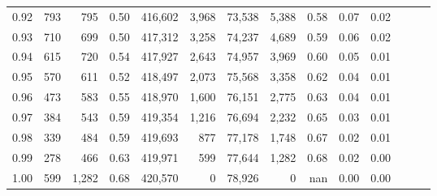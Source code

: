 \begin{tabular}{rrrrrrrrrrrrrr}
0.92 &    793 &    795 &  0.50 &  416,602 &    3,968 &  73,538 &   5,388 &  0.58 &  0.07 &      0.02 \\
0.93 &    710 &    699 &  0.50 &  417,312 &    3,258 &  74,237 &   4,689 &  0.59 &  0.06 &      0.02 \\
0.94 &    615 &    720 &  0.54 &  417,927 &    2,643 &  74,957 &   3,969 &  0.60 &  0.05 &      0.01 \\
0.95 &    570 &    611 &  0.52 &  418,497 &    2,073 &  75,568 &   3,358 &  0.62 &  0.04 &      0.01 \\
0.96 &    473 &    583 &  0.55 &  418,970 &    1,600 &  76,151 &   2,775 &  0.63 &  0.04 &      0.01 \\
0.97 &    384 &    543 &  0.59 &  419,354 &    1,216 &  76,694 &   2,232 &  0.65 &  0.03 &      0.01 \\
0.98 &    339 &    484 &  0.59 &  419,693 &      877 &  77,178 &   1,748 &  0.67 &  0.02 &      0.01 \\
0.99 &    278 &    466 &  0.63 &  419,971 &      599 &  77,644 &   1,282 &  0.68 &  0.02 &      0.00 \\
1.00 &    599 &  1,282 &  0.68 &  420,570 &        0 &  78,926 &       0 &   nan &  0.00 &      0.00 \\
\bottomrule
\end{tabular}
